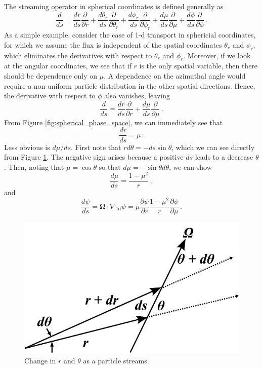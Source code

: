 The streaming operator in spherical coordinates is defined generally as 
\begin{equation}
 \frac{d}{ds} = \frac{dr}{ds}\frac{\partial}{\partial r} + \frac{d\theta_r}{ds}\frac{\partial}{\partial \theta_r} + \frac{d\phi_r}{ds}\frac{\partial}{\partial \phi_r} + \frac{d\mu}{ds}\frac{\partial}{\partial \mu} + \frac{d\phi}{ds}\frac{\partial}{\partial \phi} \, .
\end{equation}
As a simple example, consider the case of 1-d transport in sphericial coordinates, for which we assume the flux is independent of the spatial coordinates $\theta_{r}$ and $\phi_{r}$, which eliminates the derivatives with respect to $\theta_r$ and $\phi_r$.  Moreover, if we look at the angular coordinates, we see that if $r$ is the only spatial variable, then there should be dependence only on $\mu$.  A dependence on the azimuthal angle would require a non-uniform particle distribution in the other spatial directions.  Hence, the derivative with respect to $\phi$ also vanishes, leaving
\begin{equation}
 \frac{d}{ds} = \frac{dr}{ds}\frac{\partial}{\partial r} + \frac{d\mu}{ds}\frac{\partial}{\partial \mu}  \, .
\end{equation}
From Figure \ref{fig:spherical_phase_space}, we can immediately see that
\begin{equation}
 \frac{dr}{ds} = \mu \, .
 \label{eq:drds}
\end{equation}
Less obvious is $d\mu/ds$.  First note that $r d\theta = -ds \sin\theta$, which we can see directly from Figure \ref{fig:spherical_angle_with_r}.  The negative sign arises because a positive $ds$ leads to a decrease $\theta$. Then, noting that $\mu = \cos{\theta}$ so that $d\mu = -\sin{\theta} d\theta$, we can show
\begin{equation}
 \frac{d\mu}{ds} = \frac{1-\mu^2}{r} \, ,
 \label{eq:dmuds}
\end{equation}
and
\begin{equation}
 \frac{d\psi}{ds} = \mathbf{\Omega} \cdot \nabla_{\text{1d}} \psi = \mu \frac{\partial \psi}{\partial r} \frac{1-\mu^2}{r}\frac{\partial \psi}{\partial \mu} \, .
\end{equation}


\begin{figure}[ht] 
    \centering
    \includegraphics[keepaspectratio, width = 2.5 in]{spherical_angle_with_r}
    \caption{Change in $r$ and $\theta$ as a particle streams.}
    \label{fig:spherical_angle_with_r}
\end{figure}


